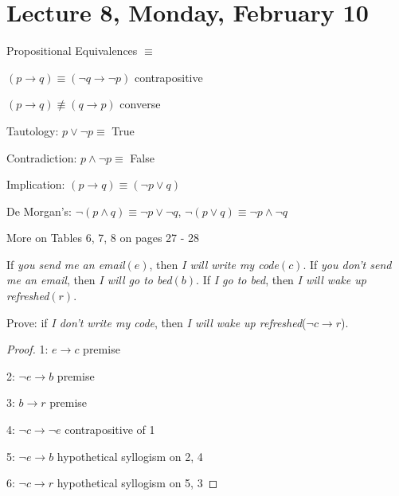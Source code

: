 \section{Lecture 8, Monday, February 10}

\begin{defn}

Propositional Equivalences $\equiv$

\end{defn}

\begin{ex}

$(p \rightarrow q) \equiv (\lnot q \rightarrow \lnot p)$ contrapositive

\end{ex}

\begin{ex}

$(p \rightarrow q) \not \equiv (q \rightarrow p)$ converse

\end{ex}

Tautology: $p \lor \lnot p \equiv$ True

Contradiction: $p \land \lnot p \equiv$ False

Implication: $(p \rightarrow q) \equiv (\lnot p \lor q)$

De Morgan's: $\lnot (p \land q) \equiv \lnot p \lor \lnot q$, $\lnot (p \lor q) \equiv \lnot p \land \lnot q$

More on Tables 6, 7, 8 on pages 27 - 28

\begin{prob}

If \textit{you send me an email}$(e)$, then \textit{I will write my code}$(c)$. If \textit{you don't send me an email}, then \textit{I will go to bed}$(b)$. If \textit{I go to bed}, then \textit{I will wake up refreshed}$(r)$.

Prove: if \textit{I don't write my code}, then \textit{I will wake up refreshed}($\lnot c \rightarrow r$).

\end{prob}

\begin{proof}

1: $e \rightarrow c$ premise

2: $\lnot e \rightarrow b$ premise

3: $b \rightarrow r$ premise

4: $\lnot c \rightarrow \lnot e$ contrapositive of 1

5: $\lnot e \rightarrow b$ hypothetical syllogism on 2, 4

6: $\lnot c \rightarrow r$ hypothetical syllogism on 5, 3

\end{proof}


